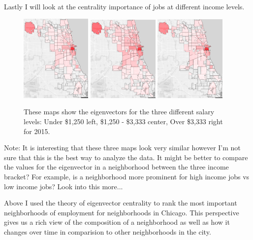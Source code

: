 \documentclass{article}
\theoremstyle{definition}
\theoremstyle{remark}
\begin{document}
Lastly I will look at the centrality importance of jobs at different income levels.

\begin{figure}[H]
    \centering
    \includegraphics[width=0.31\textwidth]{Jobs-SE001-2015}
    \includegraphics[width=0.31\textwidth]{Jobs-SE002-2015}
    \includegraphics[width=0.31\textwidth]{Jobs-SE003-2015}
    \caption{These maps show the eigenvectors for the three different salary levels: Under \$1,250 left, \$1,250 - \$3,333 center, Over \$3,333 right for 2015.}
    \label{fig:Jobs-S000-2008}
\end{figure}

Note:  It is interesting that these three maps look very similar however I'm not sure that this is the best way to analyze the data.  It might be better to compare the values for the eigenvector in a neighborhood between the three income bracket?  For example, is a neighborhood more prominent for high income jobs vs low income jobs?  Look into this more...

Above I used the theory of eigenvector centrality to rank the most important neighborhoods of employment for neighborhoods in Chicago.  This perspective gives us a rich view of the composition of a neighborhood as well as how it changes over time in comparision to other neighborhoods in the city.
\end{document}
